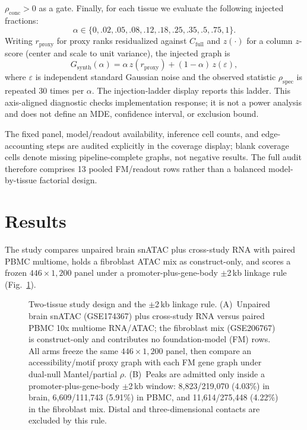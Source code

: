 \documentclass[fleqn,10pt,lineno]{wlpeerj}
\newcommand{\fitfig}[1]{\resizebox{\ifdim\width>\linewidth\linewidth\else\width\fi}{!}{#1}}
\begin{document}
$\rho_{\mathrm{conc}}>0$ as a gate.
Finally, for each tissue we evaluate the following injected fractions:
\[
\alpha\in\{0,.02,.05,.08,.12,.18,.25,.35,.5,.75,1\}.
\]
Writing $r_{\mathrm{proxy}}$ for proxy ranks residualized against $C_{\mathrm{full}}$ and $z(\cdot)$
for a column $z$-score (center and scale to unit variance), the injected graph is
\begin{equation}
\label{eq:injection}
G_{\mathrm{synth}}(\alpha)
=
\alpha\, z(r_{\mathrm{proxy}})
+
(1-\alpha)\, z(\varepsilon),
\end{equation}
where $\varepsilon$ is independent standard Gaussian noise and the observed statistic
$\rho_{\mathrm{spec}}$ is repeated
$30$ times per $\alpha$.
The injection-ladder display reports this ladder.
This axis-aligned diagnostic checks implementation
response; it is not a power analysis and does not define an MDE, confidence interval, or exclusion
bound.

The fixed panel, model/readout availability, inference cell counts, and edge-accounting
steps are audited explicitly in the coverage display; blank coverage cells denote missing
pipeline-complete graphs, not negative results. The full audit therefore comprises 13 pooled FM/readout
rows rather than a balanced model-by-tissue factorial design.

\section{Results}\label{sec:results}
The study compares unpaired brain snATAC plus cross-study RNA with paired PBMC multiome, holds a
fibroblast ATAC mix as construct-only, and scores a frozen $446\times 1{,}200$ panel under a
promoter-plus-gene-body $\pm$2\,kb linkage rule (Fig.~\ref{fig:study}).

\begin{figure}[!tbp]\centering
\fitfig{}
\caption{Two-tissue study design and the $\pm$2\,kb linkage rule. (A)~Unpaired brain snATAC
(GSE174367) plus cross-study RNA versus paired PBMC 10x multiome RNA/ATAC; the fibroblast mix
(GSE206767) is construct-only and contributes no foundation-model (FM) rows. All arms freeze the
same $446\times 1{,}200$ panel, then compare an accessibility/motif proxy graph with each FM gene
graph under dual-null Mantel/partial $\rho$. (B)~Peaks are admitted only inside a
promoter-plus-gene-body $\pm$2\,kb window: 8{,}823/219{,}070 (4.03\%) in brain, 6{,}609/111{,}743
(5.91\%) in PBMC, and 11{,}614/275{,}448 (4.22\%) in the fibroblast mix. Distal and
three-dimensional contacts are excluded by this rule.}\label{fig:study}
\end{figure}
\FloatBarrier
\end{document}
